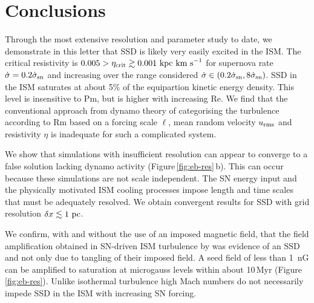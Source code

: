 \documentclass[preprint2]{aastex63}
\newcommand\SNr{\dot\sigma_{\rm sn}}
\newcommand\kpc{~ {\rm kpc}}
\newcommand\pc{~ {\rm pc}}
\newcommand\dx{ {\delta x}}
\newcommand\kms{~ {\rm km~ s}^{-1}}
\newcommand{\fg}[1]{\textcolor{midgreen}{#1}}
\begin{document}

\section{Conclusions}\label{sec:conc}

 \fg{Through the most extensive resolution and parameter study to date, we
 demonstrate in this letter that SSD is likely very easily excited in
 the ISM.
 The critical resistivity is $0.005>\eta_{\rm crit}\gtrsim0.001\kpc\kms$ for 
 supernova rate $\dot \sigma=0.2\SNr$ and increasing over the 
 range considered $\dot \sigma\in(0.2\SNr,8\SNr)$.
 SSD in the ISM saturates at about 5\% of the equipartion kinetic energy
 density.
 This level is insensitive to Pm, but is higher with increasing Re.}
 We find that the conventional approach from dynamo theory of categorising the 
 turbulence according to Rm based on a forcing scale $\ell$, mean random
 velocity $u_{\rm rms}$ and resistivity $\eta$ is inadequate for such a
 complicated system.

 We show that simulations with insufficient resolution can appear to
 converge to a false solution lacking dynamo activity
 (Figure\,\ref{fig:eb-res}\,b). This can occur because these simulations are not
 scale independent. 
 The SN energy input and the physically motivated ISM cooling processes impose
 length and time scales that must be adequately resolved.
 \fg{We obtain convergent results for SSD with grid resolution
 $\dx\lesssim1\pc$.}

 \fg{We confirm, with and without the use of an imposed magnetic field, that
 the field amplification obtained in SN-driven ISM turbulence by \citet{BKMM04}
 was evidence of an SSD and not only due to tangling of their imposed field.}
 A seed field of less than 1~nG can be amplified to saturation at microgauss
 levels within about 10\,Myr (Figure\,\ref{fig:eb-res}). 
 Unlike isothermal turbulence high Mach numbers do not necessarily impede SSD
 in the ISM with increasing SN forcing.
\end{document}
